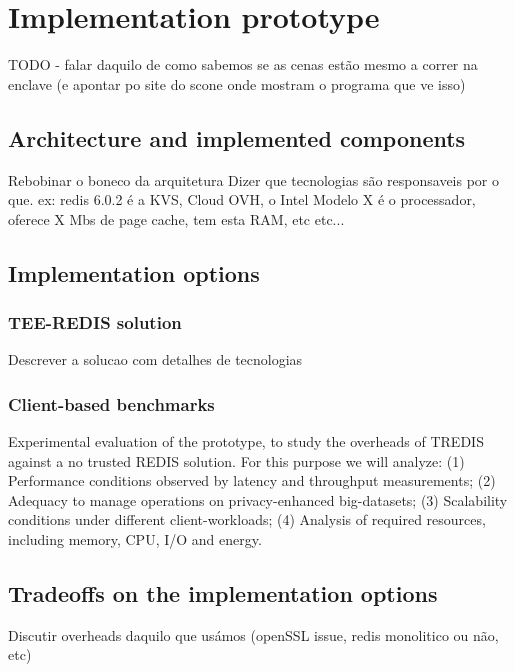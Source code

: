 \chapter{Implementation prototype}
\label{cha:workplan}

TODO - falar daquilo de como sabemos se as cenas estão mesmo a correr na enclave (e apontar po site do scone onde mostram o programa que ve isso)

\section{Architecture and implemented components}



Rebobinar o boneco da arquitetura
Dizer que tecnologias são responsaveis por o que. ex: redis 6.0.2 é a KVS, Cloud OVH, o Intel Modelo X é o processador, oferece X Mbs de page cache, tem esta RAM, etc etc...

\section{Implementation options}
\subsection{TEE-REDIS solution}
Descrever a solucao com detalhes de tecnologias
\subsection{Client-based benchmarks}


Experimental evaluation of the prototype, to study the overheads of TREDIS against a no trusted REDIS solution. For this purpose we will analyze: (1) Performance conditions observed by latency and throughput measurements; (2) Adequacy to manage operations on privacy-enhanced big-datasets; (3) Scalability conditions under different client-workloads; (4) Analysis of required resources, including memory, CPU, I/O and energy.
\section{Tradeoffs on the implementation options}
Discutir overheads daquilo que usámos (openSSL issue, redis monolitico ou não, etc)
